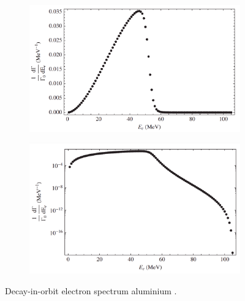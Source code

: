 \begin{figure}[!h]
     \begin{subfigure}[b]{0.4\linewidth}
         \centering
         \includegraphics[scale = 0.18]{figures/png/Screenshot_20240222_175415.png}
         \label{fig:linearscalemichel}
     \end{subfigure}
     \begin{subfigure}[b]{0.7\linewidth}
         \centering
         \includegraphics[scale = 0.18]{figures/png/Screenshot_20240222_175446.png}
         \label{fig:logscalemichel}
     \end{subfigure}
     \caption[Decay-in-orbit spectrum.]{
       Decay-in-orbit electron spectrum  aluminium \cite{PhysRevD.84.013006}.}
        \label{fig:michel}
\end{figure}

